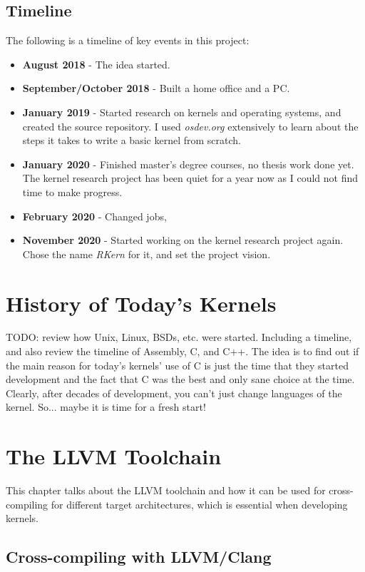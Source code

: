 \documentclass[a4paper,12pt,twoside]{book}
\begin{document}
    \section*{Timeline}
        The following is a timeline of key events in this project:
        \begin{itemize}
            \item \textbf{August 2018} - The idea started.
            \item \textbf{September/October 2018} - Built a home office and a PC.
            \item \textbf{January 2019} - Started research on kernels and operating systems, and created the source repository. I used \textit{osdev.org}\cite{osdev} extensively to learn about the steps it takes to write a basic kernel from scratch.
            \item \textbf{January 2020} - Finished master's degree courses, no thesis work done yet. The kernel research project has been quiet for a year now as I could not find time to make progress.
            \item \textbf{February 2020} - Changed jobs,
            \item \textbf{November 2020} - Started working on the kernel research project again. Chose the name \textit{RKern} for it, and set the project vision.
        \end{itemize}
    
    \chapter{History of Today's Kernels}
        TODO: review how Unix, Linux, BSDs, etc. were started. Including a timeline, and also review the timeline of Assembly, C, and C++. The idea is to find out if the main reason for today's kernels' use of C is just the time that they started development and the fact that C was the best and only sane choice at the time. Clearly, after decades of development, you can't just change languages of the kernel. So... maybe it is time for a fresh start!

    \chapter{The LLVM Toolchain}
        This chapter talks about the LLVM toolchain and how it can be used for cross-compiling for different target architectures, which is essential when developing kernels.
    
    \section{Cross-compiling with LLVM/Clang}
    
    \printbibliography
\end{document}
